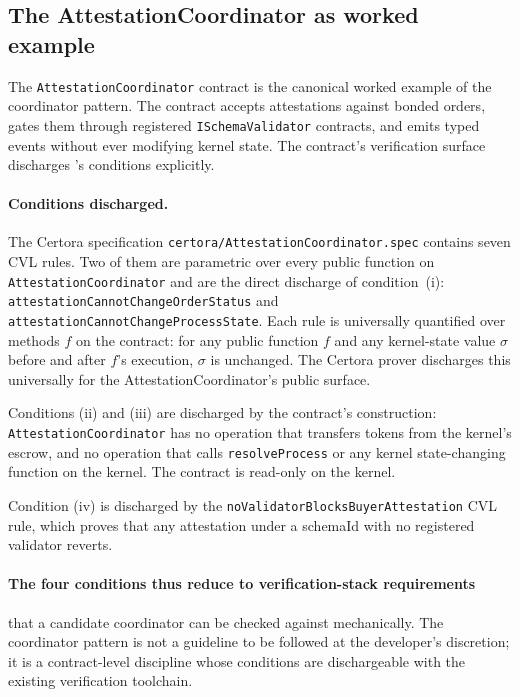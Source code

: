 \documentclass[11pt,a4paper]{article}
\theoremstyle{definition}
\theoremstyle{remark}
\begin{document}
\subsection{The AttestationCoordinator as worked example}

The \texttt{AttestationCoordinator} contract is the canonical worked
example of the coordinator pattern. The contract accepts attestations
against bonded orders, gates them through registered
\texttt{ISchemaValidator} contracts, and emits typed events without
ever modifying kernel state. The contract's verification surface
discharges 's conditions explicitly.

\paragraph{Conditions discharged.}
The Certora specification \texttt{certora/AttestationCoordinator.spec}
contains seven CVL rules. Two of them are parametric over every
public function on \texttt{AttestationCoordinator} and are the
direct discharge of condition~(i):
\texttt{attestationCannotChangeOrderStatus} and
\texttt{attestationCannotChangeProcessState}. Each rule is
universally quantified over methods $f$ on the contract: for any
public function $f$ and any kernel-state value $\sigma$ before and
after $f$'s execution, $\sigma$ is unchanged. The Certora prover
discharges this universally for the AttestationCoordinator's public
surface.

Conditions (ii) and (iii) are discharged by the contract's
construction: \texttt{AttestationCoordinator} has no operation that
transfers tokens from the kernel's escrow, and no operation that
calls \texttt{resolveProcess} or any kernel state-changing function
on the kernel. The contract is read-only on the kernel.

Condition (iv) is discharged by the
\texttt{noValidatorBlocksBuyerAttestation} CVL rule, which proves
that any attestation under a schemaId with no registered validator
reverts.

\paragraph{The four conditions thus reduce to verification-stack
requirements} that a candidate coordinator can be checked against
mechanically. The coordinator pattern is not a guideline to be
followed at the developer's discretion; it is a contract-level
discipline whose conditions are dischargeable with the existing
verification toolchain.
\end{document}
